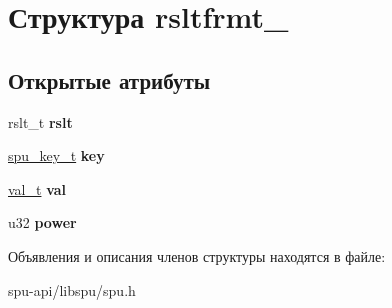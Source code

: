 \hypertarget{structrsltfrmt__2}{}\section{Структура rsltfrmt\+\_}
\label{structrsltfrmt__2}
\subsection*{Открытые атрибуты}
\begin{DoxyCompactItemize}
\item 
\mbox{\label{structrsltfrmt__2_a164b300126120520ac6dcb683760a378}} 
rslt\+\_\+t {\bfseries rslt}
\item 
\mbox{\label{structrsltfrmt__2_af7a88ab2a952427cd8e4e5d80b3cebfd}} 
\hyperlink{structdata__container}{spu\+\_\+key\+\_\+t} {\bfseries key}
\item 
\mbox{\label{structrsltfrmt__2_af6142a96e1b053960e2bf8586a30c5b8}} 
\hyperlink{structdata__container}{val\+\_\+t} {\bfseries val}
\item 
\mbox{\label{structrsltfrmt__2_ad104b51ce1d338934ad956116e40dbf4}} 
u32 {\bfseries power}
\end{DoxyCompactItemize}


Объявления и описания членов структуры находятся в файле\+:\begin{DoxyCompactItemize}
\item 
spu-\/api/libspu/spu.\+h\end{DoxyCompactItemize}
